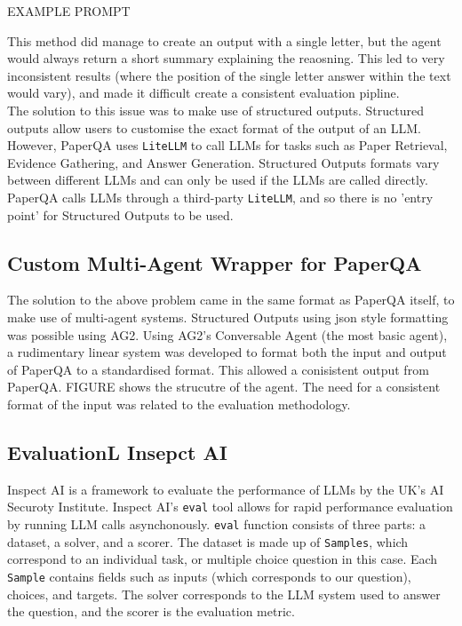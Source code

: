 EXAMPLE PROMPT

This method did manage to create an output with a single letter, but the agent would always return a short summary explaining the reaosning. 
This led to very inconsistent results (where the position of the single letter answer within the text would vary), and made it difficult create a consistent evaluation pipline. \\

The solution to this issue was to make use of structured outputs. Structured outputs allow users to customise the exact format of the output of an LLM. However, PaperQA uses \texttt{LiteLLM} to call LLMs for tasks such as Paper Retrieval, Evidence Gathering, and Answer Generation. Structured Outputs formats vary between different LLMs and can only be used if the LLMs are called directly. PaperQA calls LLMs through a third-party \texttt{LiteLLM}, and so there is no 'entry point' for Structured Outputs to be used.

\subsection{Custom Multi-Agent Wrapper for PaperQA}
The solution to the above problem came in the same format as PaperQA itself, to make use of multi-agent systems. Structured Outputs using json style formatting was possible using AG2. 
Using AG2's Conversable Agent (the most basic agent), a rudimentary linear system was developed to format both the input and output of PaperQA to a standardised format. 
This allowed a conisistent output from PaperQA. 
FIGURE shows the strucutre of the agent. 
The need for a consistent format of the input was related to the evaluation methodology. 

\subsection{EvaluationL Insepct AI}
Inspect AI is a framework to evaluate the performance of LLMs by the UK's AI Securoty Institute. Inspect AI's \texttt{eval} tool allows for rapid performance evaluation by running LLM calls asynchonously. \texttt{eval} function consists of three parts: a dataset, a solver, and a scorer. The dataset is made up of \texttt{Samples}, which correspond to an individual task, or multiple choice question in this case. Each \texttt{Sample} contains fields such as inputs (which corresponds to our question), choices, and targets. The solver corresponds to the LLM system used to answer the question, and the scorer is the evaluation metric. \\

